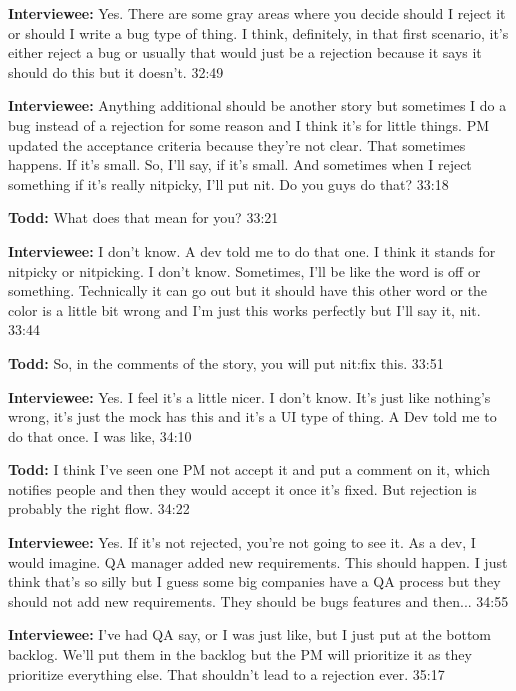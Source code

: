 \textbf{Interviewee:} Yes. There are some gray areas where you decide should I reject it or should I write a bug type of thing. I think, definitely, in that first scenario, it's either reject a bug or usually that would just be a rejection because it says it should do this but it doesn't. 32:49

\textbf{Interviewee:} Anything additional should be another story but sometimes I do a bug instead of a rejection for some reason and I think it's for little things. PM updated the acceptance criteria because they're not clear. That sometimes happens. If it's small. So, I'll say, if it's small. And sometimes when I reject something if it's really nitpicky, I'll put nit. Do you guys do that? 33:18

\textbf{Todd:} What does that mean for you? 33:21

\textbf{Interviewee:} I don't know. A dev told me to do that one. I think it stands for nitpicky or nitpicking. I don't know. Sometimes, I'll be like the word is off or something. Technically it can go out but it should have this other word or the color is a little bit wrong and I'm just this works perfectly but I'll say it, nit. 33:44

\textbf{Todd:} So, in the comments of the story, you will put nit:fix this. 33:51

\textbf{Interviewee:} Yes. I feel it's a little nicer. I don't know. It's just like nothing's wrong, it's just the mock has this and it's a UI type of thing. A Dev told me to do that once. I was like,  34:10

\textbf{Todd:} I think I've seen one PM not accept it and put a comment on it,  which notifies people and then they would accept it once it's fixed. But rejection is probably the right flow. 34:22

\textbf{Interviewee:} Yes. If it's not rejected, you're not going to see it. As a dev, I would imagine. QA manager added new requirements. This should happen. I just think that's so silly but I guess some big companies have a QA process but they should not add new requirements. They should be bugs features and then... 34:55

\textbf{Interviewee:} I've had QA say,  or  I was just like,  but I just put at the bottom backlog. We'll put them in the backlog but the PM will prioritize it as they prioritize everything else. That shouldn't lead to a rejection ever. 35:17

